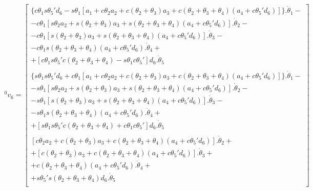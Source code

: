 \begin{equation}
    \label{eq:0v6}
\begin{gathered}
    ^0v_6 = 
    \begin{bmatrix}
        \{c\theta_1s\theta_5'd_6 - s\theta_1[a_1 + c\theta_2a_2 + c(\theta_2 + \theta_3)a_3 + c(\theta_2+\theta_3+\theta_4)(a_4 + c\theta_5'd_6)]\}.\dot{\theta}_1 - \\
        - c\theta_1[s\theta_2a_2 + s(\theta_2 + \theta_3)a_3 + s(\theta_2+\theta_3+\theta_4)(a_4 + c\theta_5'd_6)].\dot{\theta}_2 - \\
        - c\theta_1[s(\theta_2+\theta_3)a_3 + s(\theta_2+\theta_3+\theta_4)(a_4 + c\theta_5'd_6)].\dot{\theta}_3 - \\
        - c\theta_1s(\theta_2+\theta_3+\theta_4)(a_4 + c\theta_5'd_6).\dot{\theta}_4 + \\
        + [c\theta_1s\theta_5'c(\theta_2+\theta_3+\theta_4) - s\theta_1c\theta_5']d_6.\dot{\theta}_5 \\
        \\

        \{s\theta_1s\theta_5'd_6 + c\theta_1[a_1 + c\theta_2a_2 + c(\theta_2+\theta_3)a_3 + c(\theta_2 + \theta_3 + \theta_4)(a_4 + c\theta_5'd_6)]\}.\dot{\theta}_1 - \\
        -s\theta_1[s\theta_2a_2 + s(\theta_2+\theta_3)a_3 + s(\theta_2+\theta_3+\theta_4)(a_4 + c\theta_5'd_6)].\dot{\theta}_2 - \\
        -s\theta_1[s(\theta_2+\theta_3)a_3 + s(\theta_2+\theta_3+\theta_4)(a_4 + c\theta_5'd_6)].\dot{\theta}_3 - \\
        -s\theta_1s(\theta_2+\theta_3+\theta_4)(a_4 + c\theta_5'd_6).\dot{\theta}_4 + \\
        +[s\theta_1s\theta_5'c(\theta_2+\theta_3+\theta_4) + c\theta_1c\theta_5']d_6.\dot{\theta}_5\\
        \\

        [c\theta_2a_2 + c(\theta_2+\theta_3)a_3 + c(\theta_2+\theta_3+\theta_4)(a_4 + c\theta_5'd_6)].\dot{\theta}_2 + \\
        +[c(\theta_2+\theta_3)a_3 + c(\theta_2+\theta_3+\theta_4)(a_4+c\theta_5'd_6)].\dot{\theta}_3 + \\
        +c(\theta_2+\theta_3+\theta_4)(a_4+c\theta_5'd_6).\dot{\theta}_4 + \\
        +s\theta_5's(\theta_2+\theta_3+\theta_4)d_6.\dot{\theta}_5\\
    \end{bmatrix}
\end{gathered}
\end{equation}


